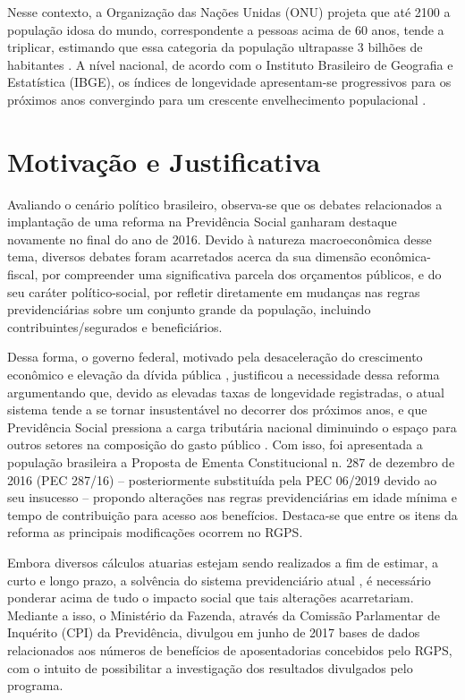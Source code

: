 Nesse contexto, a Organização das Nações Unidas (ONU) projeta que até 2100 a população idosa do mundo, correspondente a pessoas acima de 60 anos, tende a triplicar, estimando que essa categoria da população ultrapasse 3 bilhões de habitantes \cite{cap05_ref4}. A nível nacional, de acordo com o Instituto Brasileiro de Geografia e Estatística (IBGE), os índices de longevidade apresentam-se progressivos para os próximos anos convergindo para um crescente envelhecimento populacional \cite{cap05_ref5}.

\section{Motivação e Justificativa}

Avaliando o cenário político brasileiro, observa-se que os debates relacionados a implantação de uma reforma na Previdência Social ganharam destaque novamente no final do ano de 2016. Devido à natureza macroeconômica desse tema, diversos debates foram acarretados acerca da sua dimensão econômica-fiscal, por compreender uma significativa parcela dos orçamentos públicos, e do seu caráter político-social, por refletir diretamente em mudanças nas regras previdenciárias sobre um conjunto grande da população, incluindo contribuintes/segurados e beneficiários. 

Dessa forma, o governo federal, motivado pela desaceleração do crescimento econômico e elevação da dívida pública \cite{cap05_ref6}, justificou a necessidade dessa reforma argumentando que, devido as elevadas taxas de longevidade registradas, o atual sistema tende a se tornar insustentável no decorrer dos próximos anos, e que Previdência Social pressiona a carga tributária nacional diminuindo o espaço para outros setores na composição do gasto público \cite{cap05_ref7}. Com isso, foi apresentada a população brasileira a Proposta de Ementa Constitucional n. 287 de dezembro de 2016 (PEC 287/16) – posteriormente substituída pela PEC 06/2019 devido ao seu insucesso – propondo alterações nas regras previdenciárias em idade mínima e tempo de contribuição para acesso aos benefícios. Destaca-se que entre os itens da reforma as principais modificações ocorrem no RGPS.

Embora diversos cálculos atuarias estejam sendo realizados a fim de estimar, a curto e longo prazo, a solvência do sistema previdenciário atual \cite{cap01_ref1, cap01_ref4}, é necessário ponderar acima de tudo o impacto social que tais alterações acarretariam. Mediante a isso, o Ministério da Fazenda, através da Comissão Parlamentar de Inquérito (CPI) da Previdência, divulgou em junho de 2017 bases de dados relacionados aos números de benefícios de aposentadorias concebidos pelo RGPS, com o intuito de possibilitar a investigação dos resultados divulgados pelo programa.

